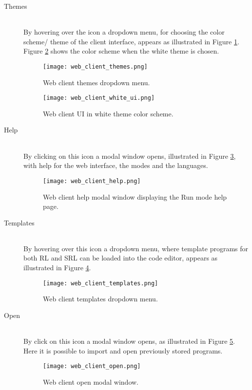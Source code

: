 \begin{description}

  \item[ Themes]~\\
    By hovering over the icon a dropdown menu, for choosing the color scheme/ theme of the client interface, appears as illustrated in Figure \ref{fig:web_client_themes}.\\
    Figure \ref{fig:web_client_white_ui} shows the color scheme when the white theme is chosen.\\
    \begin{figure}[H]
      \texttt{[image: web\_client\_themes.png]}
      \caption{Web client themes dropdown menu.}
      \label{fig:web_client_themes}
    \end{figure}
    \begin{figure}[H]
      \texttt{[image: web\_client\_white\_ui.png]}
      \caption{Web client UI in white theme color scheme.}
      \label{fig:web_client_white_ui}
    \end{figure}

  \item[ Help]~\\
    By clicking on this icon a modal window opens, illustrated in Figure \ref{fig:web_client_help}, with help for the web interface, the modes and the languages.\\
    \begin{figure}[H]
      \texttt{[image: web\_client\_help.png]}
      \caption{Web client help modal window displaying the Run mode help page.}
      \label{fig:web_client_help}
    \end{figure}

  \item[ Templates]~\\
    By hovering over this icon a dropdown menu, where template programs for both RL and SRL can be loaded into the code editor, appears as illustrated in Figure \ref{fig:web_client_templates}.\\
    \begin{figure}[H]
      \texttt{[image: web\_client\_templates.png]}
      \caption{Web client templates dropdown menu.}
      \label{fig:web_client_templates}
    \end{figure}

  \item[ Open]~\\
    By click on this icon a modal window opens, as illustrated in Figure \ref{fig:web_client_open}. Here it is possible to import and open previously stored programs.\\
    \begin{figure}[H]
      \texttt{[image: web\_client\_open.png]}
      \caption{Web client open modal window.}
      \label{fig:web_client_open}
    \end{figure}


\end{description}

